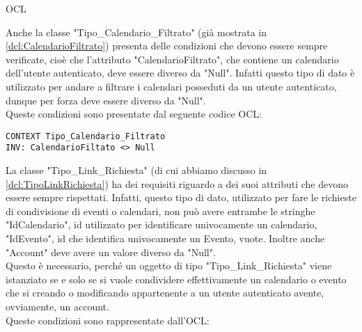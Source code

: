 \begin{listaPersonale}{OCL}
    \begin{center}
        
    \end{center}
    Anche la classe "Tipo\_Calendario\_Filtrato" (già mostrata in \ref{dcl:CalendarioFiltrato}) presenta delle condizioni che devono essere sempre verificate, cioè che l'attributo "CalendarioFiltrato", che contiene un calendario dell'utente autenticato, deve essere diverso da "Null". Infatti questo tipo di dato è utilizzato per andare a filtrare i calendari posseduti da un utente autenticato, dunque per forza deve essere diverso da "Null". \\
    Queste condizioni sono presentate dal seguente codice OCL:
    \begin{lstlisting}
CONTEXT Tipo_Calendario_Filtrato
INV: CalendarioFiltato <> Null
    \end{lstlisting}




    \begin{center}
        
    \end{center}
    La classe "Tipo\_Link\_Richiesta" (di cui abbiamo discusso in \ref{dcl:TipoLinkRichiesta}) ha dei requisiti riguardo a dei suoi attributi che devono essere sempre rispettati. Infatti, questo tipo di dato, utilizzato per fare le richieste di condivisione di eventi o calendari, non può avere entrambe le stringhe "IdCalendario", id utilizzato per identificare univocamente un calendario, "IdEvento", id che identifica univocamente un Evento, vuote. Inoltre anche "Account" deve avere un valore diverso da "Null". \\ Questo è necessario, perché un oggetto di tipo "Tipo\_Link\_Richiesta" viene istanziato se e solo se si vuole condividere effettivamente un calendario o evento che si creando o modificando appartenente a un utente autenticato avente, ovviamente, un account.\\
    Queste condizioni sono rappresentate dall'OCL:


\end{listaPersonale}
